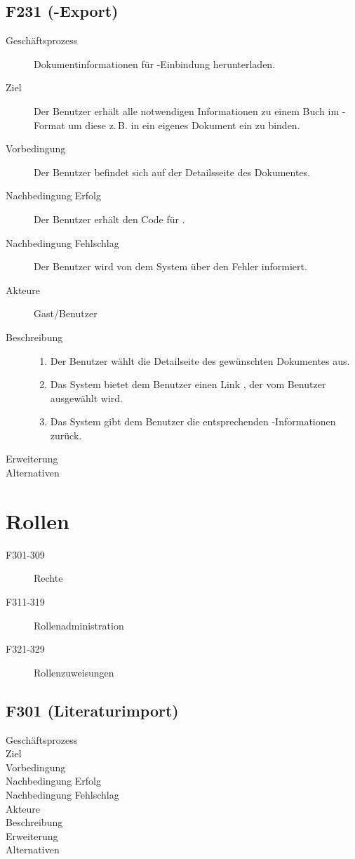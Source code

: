 \subsection{F231 (\BibTeX -Export)}
\begin{description}
  \item[Geschäftsprozess]Dokumentinformationen für \BibTeX-Einbindung herunterladen.
  \item[Ziel]Der Benutzer erhält alle notwendigen Informationen zu einem Buch im \BibTeX-Format um diese z.\,B. in ein eigenes Dokument ein zu binden.
  \item[Vorbedingung]Der Benutzer befindet sich auf der Detailsseite des Dokumentes.
  \item[Nachbedingung Erfolg]Der Benutzer erhält den Code für \BibTeX .
  \item[Nachbedingung Fehlschlag]Der Benutzer wird von dem System über den Fehler informiert.
  \item[Akteure]Gast/Benutzer
  \item[Beschreibung]\hfill
    \begin{enumerate}
      \item Der Benutzer wählt die Detailseite des gewünschten Dokumentes aus.
      \item Das System bietet dem Benutzer einen Link \emph{\BibTeX}, der vom Benutzer ausgewählt wird.
      \item Das System gibt dem Benutzer die entsprechenden \BibTeX -Informationen zurück.
    \end{enumerate}
  \item[Erweiterung]
  \item[Alternativen]
\end{description}


\section{Rollen}
\begin{description}
  \item[F301-309]Rechte
  \item[F311-319]Rollenadministration
  \item[F321-329]Rollenzuweisungen
\end{description}

\subsection{F301 (Literaturimport)}
\begin{description}
  \item[Geschäftsprozess]
  \item[Ziel]
  \item[Vorbedingung]
  \item[Nachbedingung Erfolg]
  \item[Nachbedingung Fehlschlag]
  \item[Akteure]
  \item[Beschreibung]
  \item[Erweiterung]
  \item[Alternativen]
\end{description}

